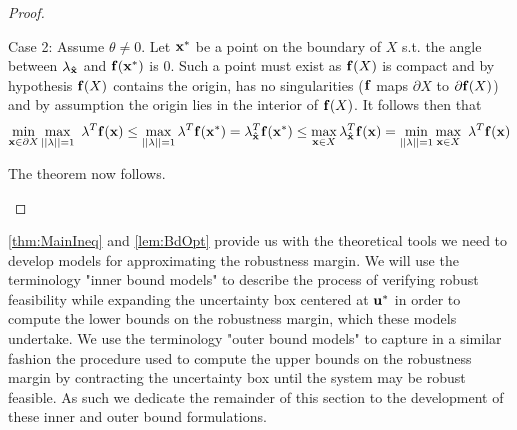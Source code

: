 \begin{thm}
\begin{proof}
\begin{itemize}
Case 2: Assume $\theta \neq 0$. 
Let $\bold{x^*}$ be a point on the boundary of $X$ s.t. the angle between $\bold{\lambda}_{\bold{\hat{x}}}$ and $\bold{f}(\bold{x^*})$ is 0. 
Such a point must exist as $\bold{f}(X)$ is compact and by hypothesis $\bold{f}(X)$ contains the origin, has no singularities ($\bold{f}$ maps $\partial X$ to $\partial \bold{f}(X)$) and by assumption the origin lies in the interior of $\bold{f}(X)$. 
It follows then that $$\min\limits_{\bold x\in \partial X}\max\limits_{||\bold{\lambda}||=1}\ \bold{\lambda}^T\bold{f}(\bold x)\leq \max\limits_{||\bold{\lambda}||=1}\bold{\lambda}^T \bold{f}(\bold{x^*}) =\bold{\lambda}_{\bold{\hat{x}}}^T\bold{f}(\bold{x^*})\leq \max\limits_{\bold x\in X}\bold{\lambda}_{\bold{\hat{x}}}^T\bold{f}(\bold x)=\min\limits_{||\bold{\lambda}||=1}\max\limits_{\bold x\in X}\ \bold{\lambda}^T\bold{f}(\bold x)$$

The theorem now follows.
\end{itemize}
\end{proof}
\end{thm}

\cref{thm:MainIneq} and \cref{lem:BdOpt} provide us with the theoretical tools we need to develop models for approximating the robustness margin.
We will use the terminology "inner bound models" to describe the process of verifying robust feasibility while expanding the uncertainty box centered at $\bold u^*$ in order to compute the lower bounds on the robustness margin, which these models undertake. 
We use the terminology "outer bound models" to capture in a similar fashion the procedure used to compute the upper bounds on the robustness margin by contracting the uncertainty box until the system may be robust feasible. 
As such we dedicate the remainder of this section to the development of these inner and outer bound formulations. 
